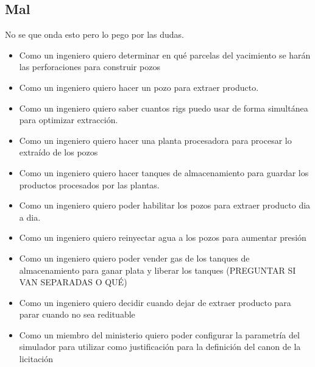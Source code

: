 \subsection{Mal}
\par No se que onda esto pero lo pego por las dudas.
\begin{itemize}
  \item Como un ingeniero quiero determinar en qué parcelas del yacimiento se harán las perforaciones para construir pozos
  \item Como un ingeniero quiero hacer un pozo para extraer producto.
  \item Como un ingeniero quiero saber cuantos rigs puedo usar de forma simultánea para optimizar extracción.
  \item Como un ingeniero quiero hacer una planta procesadora para procesar lo extraído de los pozos
  \item Como un ingeniero quiero hacer tanques de almacenamiento para guardar los productos procesados por las plantas.
  \item Como un ingeniero quiero poder habilitar los pozos para extraer producto dia a dia.
  \item Como un ingeniero quiero reinyectar agua a los pozos para aumentar presión
  \item Como un ingeniero quiero poder vender gas de los tanques de almacenamiento para ganar plata y liberar los tanques (PREGUNTAR SI VAN SEPARADAS O QUÉ)
  \item Como un ingeniero quiero decidir cuando dejar de extraer producto para parar cuando no sea redituable
  \item Como un miembro del ministerio quiero poder configurar la parametría del simulador para utilizar como justificación para la definición del canon de la licitación
\end{itemize}
